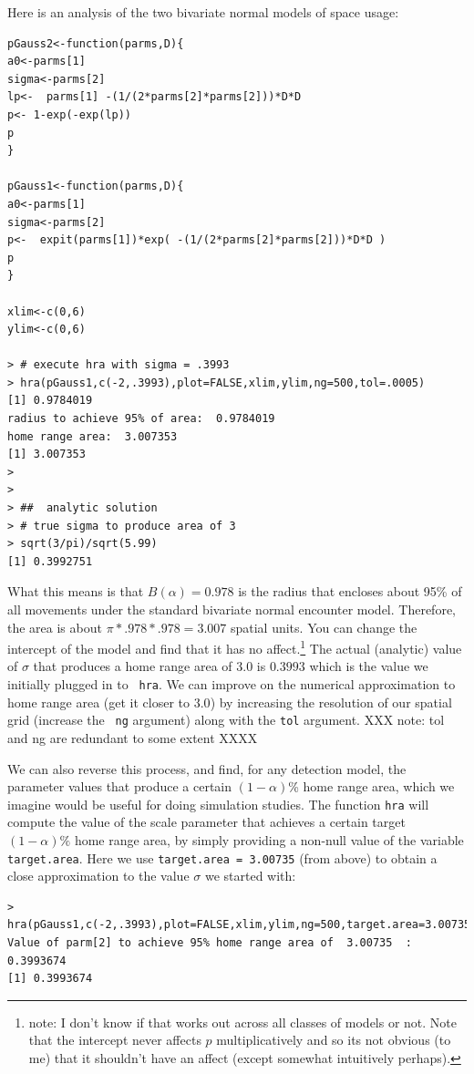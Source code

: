 Here is an analysis of the two bivariate normal models of space usage:
{\small 
\begin{verbatim}
pGauss2<-function(parms,D){
a0<-parms[1]
sigma<-parms[2]
lp<-  parms[1] -(1/(2*parms[2]*parms[2]))*D*D
p<- 1-exp(-exp(lp))
p
}

pGauss1<-function(parms,D){
a0<-parms[1]
sigma<-parms[2]
p<-  expit(parms[1])*exp( -(1/(2*parms[2]*parms[2]))*D*D )
p
}

xlim<-c(0,6)
ylim<-c(0,6)

> # execute hra with sigma = .3993
> hra(pGauss1,c(-2,.3993),plot=FALSE,xlim,ylim,ng=500,tol=.0005)
[1] 0.9784019
radius to achieve 95% of area:  0.9784019
home range area:  3.007353
[1] 3.007353
>
> 
> ##  analytic solution
> # true sigma to produce area of 3
> sqrt(3/pi)/sqrt(5.99)
[1] 0.3992751
\end{verbatim}
}

What this means is that $B(\alpha) = 0.978$ is the radius that
encloses about 95\% of all movements under the standard bivariate
normal encounter model.  Therefore, the area is about $\pi*.978*.978 =
3.007$ spatial units.  You can change the intercept of the model and
find that it has no affect.\footnote{ note: I don't know if that works
  out across all classes of models or not. Note that the intercept
  never affects $p$ multiplicatively and so its not obvious (to me)
  that it shouldn't have an affect (except somewhat intuitively
  perhaps).}  The actual
(analytic) value of $\sigma$ that produces a home range area of 3.0 is
$0.3993$ which is the value we initially plugged in to \mbox{\tt
  hra}. We can improve on the numerical approximation to home range
area (get it closer to $3.0$) by increasing 
the resolution of our spatial grid (increase the \mbox{\tt
  ng} argument) along with the \mbox{\tt tol} argument. XXX note: tol
and ng are redundant to some extent XXXX

We can also reverse this process, and find, for any detection model,
the parameter values that produce a certain $(1-\alpha)$\% home range
area, which we imagine would be useful for doing simulation studies.
The function \mbox{\tt hra} will compute the value of the scale parameter 
that achieves a certain target $(1-\alpha)\%$ home range area, by
simply providing a non-null value of the variable \mbox{\tt
  target.area}. Here we use \mbox{\tt target.area = 3.00735} (from
above) to obtain a close approximation to the value $\sigma$ we
started with:
{\small
\begin{verbatim}
> hra(pGauss1,c(-2,.3993),plot=FALSE,xlim,ylim,ng=500,target.area=3.00735,tol=.0005)
Value of parm[2] to achieve 95% home range area of  3.00735  :  0.3993674
[1] 0.3993674
\end{verbatim}
}

